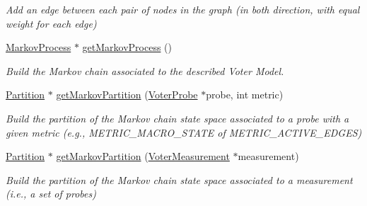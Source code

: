 \begin{DoxyCompactItemize}
\begin{DoxyCompactList}\small\item\em Add an edge between each pair of nodes in the graph (in both direction, with equal weight for each edge) \end{DoxyCompactList}\item 
\hyperlink{class_markov_process}{Markov\+Process} $\ast$ \hyperlink{class_voter_graph_acc86929339ec0a0ce2946146919b1eb7}{get\+Markov\+Process} ()
\begin{DoxyCompactList}\small\item\em Build the Markov chain associated to the described Voter Model. \end{DoxyCompactList}\item 
\hyperlink{class_partition}{Partition} $\ast$ \hyperlink{class_voter_graph_a2303b38ee1a599554f730236d9f4fc7c}{get\+Markov\+Partition} (\hyperlink{class_voter_probe}{Voter\+Probe} $\ast$probe, int metric)
\begin{DoxyCompactList}\small\item\em Build the partition of the Markov chain state space associated to a probe with a given metric (e.\+g., M\+E\+T\+R\+I\+C\+\_\+\+M\+A\+C\+R\+O\+\_\+\+S\+T\+A\+T\+E of M\+E\+T\+R\+I\+C\+\_\+\+A\+C\+T\+I\+V\+E\+\_\+\+E\+D\+G\+E\+S) \end{DoxyCompactList}\item 
\hyperlink{class_partition}{Partition} $\ast$ \hyperlink{class_voter_graph_a2c0a299c1249cc04e011d0f507467007}{get\+Markov\+Partition} (\hyperlink{class_voter_measurement}{Voter\+Measurement} $\ast$measurement)
\begin{DoxyCompactList}\small\item\em Build the partition of the Markov chain state space associated to a measurement (i.\+e., a set of probes) \end{DoxyCompactList}\end{DoxyCompactItemize}
